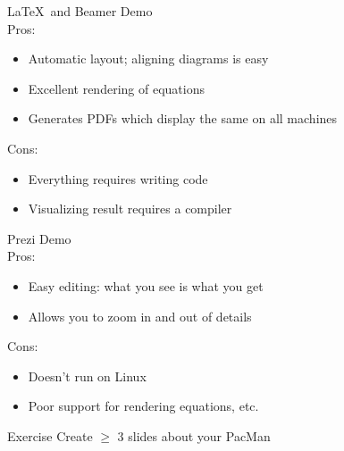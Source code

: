 \documentclass{beamer}
\begin{document}
\begin{frame}{\LaTeX\ and Beamer}
Demo\\
\bigskip
Pros:
\begin{itemize}
\item Automatic layout; aligning diagrams is easy
\item Excellent rendering of equations
\item Generates PDFs which display the same on all machines
\end{itemize}
Cons:
\begin{itemize}
\item Everything requires writing code
\item Visualizing result requires a compiler
\end{itemize}
\end{frame}

\begin{frame}{Prezi}
Demo\\
\bigskip
Pros:
\begin{itemize}
\item Easy editing: what you see is what you get
\item Allows you to zoom in and out of details
\end{itemize}
Cons:
\begin{itemize}
\item Doesn't run on Linux
\item Poor support for rendering equations, etc.
\end{itemize}
\end{frame}

\begin{frame}{Exercise}
\centering
Create $\geq$ 3 slides about your PacMan
\end{frame}
\end{document}
